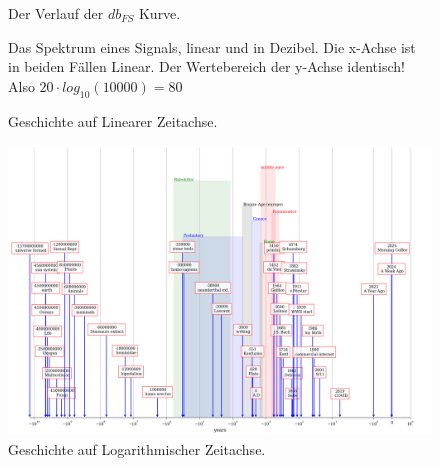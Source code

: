 


\begin{figure}[h!]
    \centering
    
    \caption{Der Verlauf der $db_{FS}$ Kurve.}
    \label{fig:dbfs}
\end{figure}


\begin{figure}[h!]
    \centering
    
    \caption{Das Spektrum eines Signals, linear und in Dezibel. Die x-Achse ist in beiden Fällen Linear. Der Wertebereich der y-Achse identisch! Also $20\cdot log_{10}(10000) = 80$}
    \label{fig:figure1}
\end{figure}


\begin{figure}[h!]
    \centering
    
    \caption{Geschichte auf Linearer Zeitachse.}
    \label{fig:time_lin}
\end{figure}


\newpage
\begin{figure}[h!]
    \centering
    \includegraphics[height=\textwidth, angle=90]{img/time_log.png}
    \caption{Geschichte auf Logarithmischer Zeitachse.}
    \label{fig:time_log}
\end{figure}





